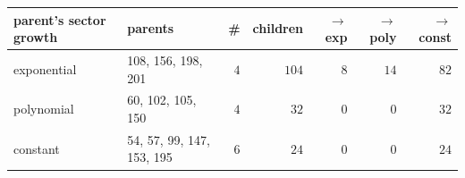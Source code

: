 \begin{tabular}{llrrrrr}
\hline
parent's sector growth & parents & \# & children & $\to$exp & $\to$poly & $\to$const \\
\hline
exponential & 108, 156, 198, 201 & $4$ & $104$ & $8$ & $14$ & $82$ \\
polynomial & 60, 102, 105, 150 & $4$ & $32$ & $0$ & $0$ & $32$ \\
constant & 54, 57, 99, 147, 153, 195 & $6$ & $24$ & $0$ & $0$ & $24$ \\
\hline
\end{tabular}
